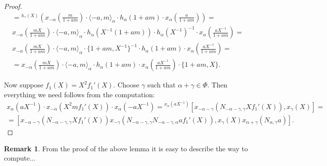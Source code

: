 \documentclass[oneside, 10pt]{amsart}
\theoremstyle{remark}
\theoremstyle{definition}
\newtheorem{rem}[lemma]{Remark}
\numberwithin{equation}{section}
\begin{document}
\begin{proof}
\begin{multline*}
 = {}^{h_\gamma(X)}\left( x_{-\alpha}\left(\frac{m}{1+am}\right) \cdot \langle -a, m\rangle_\alpha \cdot h_\alpha(1+am) \cdot x_\alpha\left(\frac{a}{1+am}\right) \right) = \\
 x_{-\alpha}\left(\frac{mX}{1+am}\right) \cdot \langle -a, m\rangle_\alpha \cdot h_\alpha(X^{-1}(1+am))\cdot h_\alpha(X^{-1})^{-1} \cdot x_{\alpha}\left(\frac{aX^{-1}}{1+am}\right) = \\
 x_{-\alpha}\left(\frac{mX}{1+am}\right) \cdot \langle -a, m\rangle_\alpha \cdot \{1+am, X^{-1}\}^{-1} \cdot h_\alpha(1+am)\cdot x_{\alpha}\left(\frac{aX^{-1}}{1+am}\right) = \\
 = x_{-\alpha}\left(\frac{mX}{1+am}\right) \cdot \langle -a, m\rangle_\alpha \cdot h_\alpha(1+am) \cdot x_{\alpha}\left(\frac{aX^{-1}}{1+am}\right) \cdot \{1+am, X\}.
\end{multline*}

Now suppose $f_1(X) = X^2f_1'(X)$. Choose $\gamma$ such that $\alpha + \gamma \in \Phi$.
Then everything we need follows from the computation:
\begin{multline*}
 x_\alpha(aX^{-1}) \cdot x_{-\alpha}(X^2 mf_1'(X)) \cdot x_\alpha(-aX^{-1}) = 
 {}^{x_\alpha(aX^{-1})}[x_{-\alpha - \gamma}(N_{-\alpha-\gamma, \gamma}Xf_1'(X)), x_{\gamma}(X)] = \\
 = [x_{-\alpha-\gamma}(N_{-\alpha-\gamma, \gamma}Xf_1'(X)) x_{-\gamma}(N_{-\alpha-\gamma, \gamma} N_{-\alpha-\gamma, \alpha} af_1'(X)), x_\gamma(X) x_{\alpha+\gamma}(N_{\alpha,\gamma}a)].
\end{multline*} 
\end{proof}

\begin{rem}
 From the proof of the above lemma it is easy to describe the way to compute... 
\end{rem}

%

\printbibliography
\end{document}

